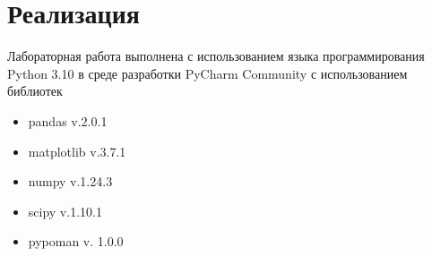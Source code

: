 \section{Реализация}
Лабораторная работа выполнена с использованием языка программирования Python 3.10 в среде разработки PyCharm Community с использованием библиотек

\begin{itemize}
	\item pandas v.2.0.1
	\item matplotlib v.3.7.1
	\item numpy v.1.24.3
	\item scipy v.1.10.1
	\item pypoman v. 1.0.0
\end{itemize}


\newpage
